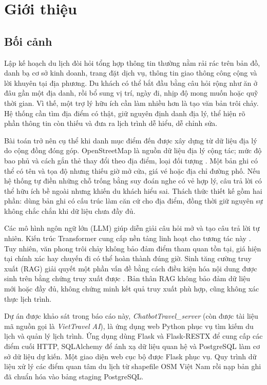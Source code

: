 \chapter{Giới thiệu}
\label{chap:introduction}

\section{Bối cảnh}

Lập kế hoạch du lịch đòi hỏi tổng hợp thông tin thường nằm rải rác trên bản đồ, danh bạ cơ sở kinh doanh, trang đặt dịch vụ, thông tin giao thông công cộng và lời khuyên tại địa phương. Du khách có thể bắt đầu bằng câu hỏi rộng như ăn ở đâu gần một địa danh, rồi bổ sung vị trí, ngày đi, nhịp độ mong muốn hoặc quỹ thời gian. Vì thế, một trợ lý hữu ích cần làm nhiều hơn là tạo văn bản trôi chảy. Hệ thống cần tìm địa điểm có thật, giữ nguyên định danh địa lý, thể hiện rõ phần thông tin còn thiếu và đưa ra lịch trình dễ hiểu, dễ chỉnh sửa.

Bài toán trở nên cụ thể khi danh mục điểm đến được xây dựng từ dữ liệu địa lý do cộng đồng đóng góp. OpenStreetMap là nguồn dữ liệu địa lý cộng tác; mức độ bao phủ và cách gắn thẻ thay đổi theo địa điểm, loại đối tượng \cite{haklay2008openstreetmap}. Một bản ghi có thể có tên và tọa độ nhưng thiếu giờ mở cửa, giá vé hoặc địa chỉ đường phố. Nếu hệ thống tự điền những chỗ trống bằng suy đoán nghe có vẻ hợp lý, câu trả lời có thể hữu ích bề ngoài nhưng khiến du khách hiểu sai. Thách thức thiết kế gồm hai phần: dùng bản ghi có cấu trúc làm căn cứ cho địa điểm, đồng thời giữ nguyên sự không chắc chắn khi dữ liệu chưa đầy đủ.

Các mô hình ngôn ngữ lớn (LLM) giúp diễn giải câu hỏi mở và tạo câu trả lời tự nhiên. Kiến trúc Transformer cung cấp nền tảng linh hoạt cho tương tác này \cite{vaswani2017attention,brown2020language}. Tuy nhiên, văn phong trôi chảy không bảo đảm điểm tham quan tồn tại, giá hiện tại chính xác hay chuyến đi có thể hoàn thành đúng giờ. Sinh tăng cường truy xuất (RAG) giải quyết một phần vấn đề bằng cách điều kiện hóa nội dung được sinh trên bằng chứng truy xuất được \cite{lewis2020retrieval,gao2023retrieval}. Bản thân RAG không bảo đảm dữ liệu mới hoặc đầy đủ, không chứng minh kết quả truy xuất phù hợp, cũng không xác thực lịch trình.

Dự án được khảo sát trong báo cáo này, \textit{ChatbotTravel\_server} (còn được tài liệu mã nguồn gọi là \textit{VietTravel AI}), là ứng dụng web Python phục vụ tìm kiếm du lịch và quản lý lịch trình. Ứng dụng dùng Flask và Flask-RESTX để cung cấp các điểm cuối HTTP, SQLAlchemy để ánh xạ dữ liệu quan hệ và PostgreSQL làm cơ sở dữ liệu dự kiến. Một giao diện web cục bộ được Flask phục vụ. Quy trình dữ liệu xử lý các điểm quan tâm du lịch từ shapefile OSM Việt Nam rồi nạp bản ghi đã chuẩn hóa vào bảng staging PostgreSQL.

